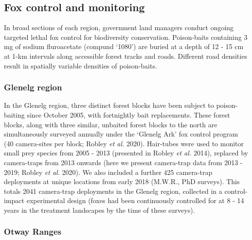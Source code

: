 \documentclass[11pt,a4paper,titlepage,twoside,openright]{style/unimelbthesis}
\begin{document}
\begin{mainmatter}
\hypertarget{fox-control-and-monitoring}{%
\subsection{Fox control and monitoring}\label{fox-control-and-monitoring}}

In broad sections of each region, government land managers conduct ongoing targeted lethal fox control for biodiversity conservation. Poison-baits containing 3 mg of sodium fluroacetate (compund `1080') are buried at a depth of 12 - 15 cm at 1-km intervals along accessible forest tracks and roads. Different road densities result in spatially variable densities of poison-baits.

\hypertarget{glenelg-region-1}{%
\subsubsection{Glenelg region}\label{glenelg-region-1}}

In the Glenelg region, three distinct forest blocks have been subject to poison-baiting since October 2005, with fortnightly bait replacements. These forest blocks, along with three similar, unbaited forest blocks to the north are simultaneously surveyed annually under the `Glenelg Ark' fox control program (40 camera-sites per block; Robley \emph{et al.} 2020). Hair-tubes were used to monitor small prey species from 2005 - 2013 (presented in Robley \emph{et al.} 2014), replaced by camera-traps from 2013 onwards (here we present camera-trap data from 2013 - 2019; Robley \emph{et al.} 2020). We also included a further 425 camera-trap deployments at unique locations from early 2018 (M.W.R., PhD surveys). This totals 2041 camera-trap deployments in the Glenelg region, collected in a control-impact experimental design (foxes had been continuously controlled for at 8 - 14 years in the treatment landscapes by the time of these surveys).

\hypertarget{otway-ranges-1}{%
\subsubsection{Otway Ranges}\label{otway-ranges-1}}


\end{mainmatter}
\end{document}
